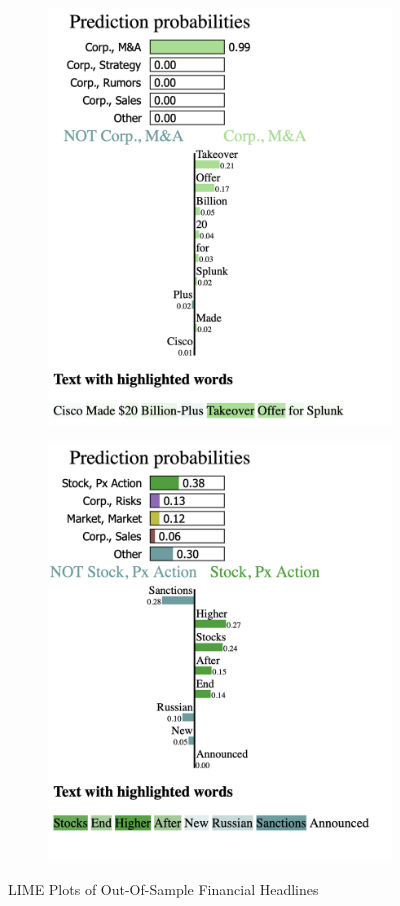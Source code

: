 \begin{figure}
    \begin{subfigure}{.5\textwidth}
        \centering
        \includegraphics[width=.8\linewidth]{images/lime_m&a.png}
        \label{fig:lime1}
    \end{subfigure}%
    \begin{subfigure}{.5\textwidth}
        \centering
        \includegraphics[width=.8\linewidth]{images/lime_price_action_2.png}
        \label{fig:lime3}
    \end{subfigure}
    \caption{LIME Plots of Out-Of-Sample Financial Headlines}
    \label{fig:fig}
\end{figure}


